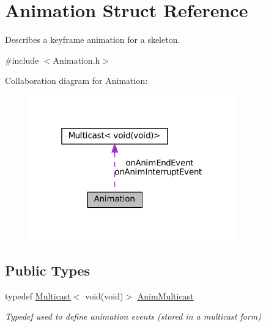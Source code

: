 \hypertarget{structAnimation}{}\section{Animation Struct Reference}
\label{structAnimation}


Describes a keyframe animation for a skeleton.  




{\ttfamily \#include $<$Animation.\+h$>$}



Collaboration diagram for Animation\+:
\nopagebreak
\begin{figure}[H]
\begin{center}
\leavevmode
\includegraphics[width=253pt]{structAnimation__coll__graph}
\end{center}
\end{figure}
\subsection*{Public Types}
\begin{DoxyCompactItemize}
\item 
\mbox{\label{structAnimation_ac07104f8333840b8c2fca7fe620ace19}} 
typedef \hyperlink{classMulticast}{Multicast}$<$ void(void)$>$ \hyperlink{structAnimation_ac07104f8333840b8c2fca7fe620ace19}{Anim\+Multicast}
\begin{DoxyCompactList}\small\item\em Typedef used to define animation events (stored in a multicast form) \end{DoxyCompactList}\end{DoxyCompactItemize}
